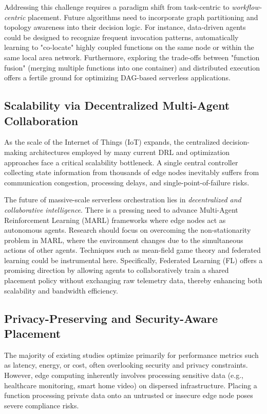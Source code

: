 \documentclass[lettersize,journal]{IEEEtran}
\begin{document}
Addressing this challenge requires a paradigm shift from task-centric to \textit{workflow-centric} placement. Future algorithms need to incorporate graph partitioning and topology awareness into their decision logic. For instance, data-driven agents could be designed to recognize frequent invocation patterns, automatically learning to "co-locate" highly coupled functions on the same node or within the same local area network. Furthermore, exploring the trade-offs between "function fusion" (merging multiple functions into one container) and distributed execution offers a fertile ground for optimizing DAG-based serverless applications.

\subsection{Scalability via Decentralized Multi-Agent Collaboration}
As the scale of the Internet of Things (IoT) expands, the centralized decision-making architectures employed by many current DRL and optimization approaches face a critical scalability bottleneck. A single central controller collecting state information from thousands of edge nodes inevitably suffers from communication congestion, processing delays, and single-point-of-failure risks.

The future of massive-scale serverless orchestration lies in \textit{decentralized and collaborative intelligence}. There is a pressing need to advance Multi-Agent Reinforcement Learning (MARL) frameworks where edge nodes act as autonomous agents. Research should focus on overcoming the non-stationarity problem in MARL, where the environment changes due to the simultaneous actions of other agents. Techniques such as mean-field game theory and federated learning could be instrumental here. Specifically, Federated Learning (FL) offers a promising direction by allowing agents to collaboratively train a shared placement policy without exchanging raw telemetry data, thereby enhancing both scalability and bandwidth efficiency.

\subsection{Privacy-Preserving and Security-Aware Placement}
The majority of existing studies optimize primarily for performance metrics such as latency, energy, or cost, often overlooking security and privacy constraints. However, edge computing inherently involves processing sensitive data (e.g., healthcare monitoring, smart home video) on dispersed infrastructure. Placing a function processing private data onto an untrusted or insecure edge node poses severe compliance risks.
\end{document}
